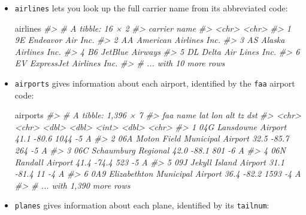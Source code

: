 \documentclass[]{book}
\newenvironment{Shaded}{\begin{snugshade}}{\end{snugshade}}
\newcommand{\CommentTok}[1]{\textcolor[rgb]{0.56,0.35,0.01}{\textit{{#1}}}}
\newcommand{\NormalTok}[1]{{#1}}
\begin{document}
\begin{itemize}
\item
  \texttt{airlines} lets you look up the full carrier name from its
  abbreviated code:

\begin{Shaded}
\begin{Highlighting}[]
\NormalTok{airlines}
\CommentTok{#> # A tibble: 16 × 2}
\CommentTok{#>   carrier                     name}
\CommentTok{#>     <chr>                    <chr>}
\CommentTok{#> 1      9E        Endeavor Air Inc.}
\CommentTok{#> 2      AA   American Airlines Inc.}
\CommentTok{#> 3      AS     Alaska Airlines Inc.}
\CommentTok{#> 4      B6          JetBlue Airways}
\CommentTok{#> 5      DL     Delta Air Lines Inc.}
\CommentTok{#> 6      EV ExpressJet Airlines Inc.}
\CommentTok{#> # ... with 10 more rows}
\end{Highlighting}
\end{Shaded}
\item
  \texttt{airports} gives information about each airport, identified by
  the \texttt{faa} airport code:

\begin{Shaded}
\begin{Highlighting}[]
\NormalTok{airports}
\CommentTok{#> # A tibble: 1,396 × 7}
\CommentTok{#>     faa                           name   lat   lon   alt    tz   dst}
\CommentTok{#>   <chr>                          <chr> <dbl> <dbl> <int> <dbl> <chr>}
\CommentTok{#> 1   04G              Lansdowne Airport  41.1 -80.6  1044    -5     A}
\CommentTok{#> 2   06A  Moton Field Municipal Airport  32.5 -85.7   264    -5     A}
\CommentTok{#> 3   06C            Schaumburg Regional  42.0 -88.1   801    -6     A}
\CommentTok{#> 4   06N                Randall Airport  41.4 -74.4   523    -5     A}
\CommentTok{#> 5   09J          Jekyll Island Airport  31.1 -81.4    11    -4     A}
\CommentTok{#> 6   0A9 Elizabethton Municipal Airport  36.4 -82.2  1593    -4     A}
\CommentTok{#> # ... with 1,390 more rows}
\end{Highlighting}
\end{Shaded}
\item
  \texttt{planes} gives information about each plane, identified by its
  \texttt{tailnum}:


\end{itemize}
\end{document}

